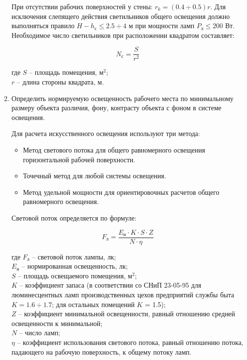 \begin{enumerate}
При отсутствии рабочих поверхностей у стены: $r_k = (0.4 \div 0.5)r$.
Для исключения слепящего действия светильников общего освещения должно выполняться правило $H - h_{\text{с}} \leq 2.5 \div 4$ м при мощности ламп $P_{\text{л}} \leq 200$ Вт. Необходимое число светильников при расположении квадратом составляет:

\begin{equation}
N_\text{с} = \frac{S}{r^2}
\label{F:Nc}
\end{equation}

где $S$ – площадь помещения, $\text{м}^2$; \\ $r$ – длина стороны квадрата, м.

\item Определить нормируемую освещенность рабочего места по минимальному размеру объекта различия, фону, контрасту объекта с фоном в системе освещения.

Для расчета искусственного освещения используют три метода:

\begin{itemize}
\item Метод светового потока для общего равномерного освещения горизонтальной рабочей поверхности.
\item Точечный метод для любой системы освещения.
\item Метод удельной мощности для ориентировочных расчетов общего равномерного освещения.
\end{itemize}

Световой поток определяется по формуле:

\begin{equation}
F_\text{л} = \frac{E_\text{н} \cdot K \cdot S \cdot Z}{N \cdot \eta}
\label{F:Fl}
\end{equation}

где $F_\text{л}$ – световой поток лампы, лк; \\ $E_\text{н}$ – нормированная освещенность, лк; \\ $S$ – площадь освещаемого помещения, $\text{м}^2$; \\ $K$ – коэффициент запаса (в соответствии со СНиП 23-05-95 для люминесцентных ламп производственных цехов предприятий службы быта $K  = 1.6 \div 1.7 $; для остальных помещений $K$ = 1.5); \\  $Z$ – коэффициент минимальной освещенности, равный отношению средней освещенности к минимальной; \\ $N$ – число ламп; \\ $\eta$ – коэффициент использования светового потока, равный отношению потока, падающего на рабочую поверхность, к общему потоку ламп.


\end{enumerate}
